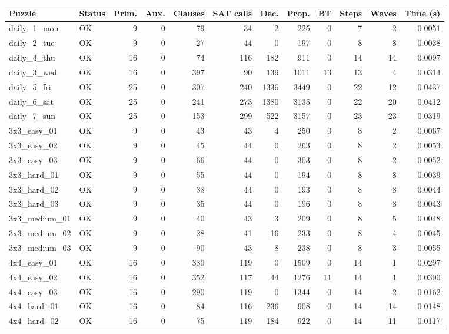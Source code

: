 \begin{tabular}{l l r r r r r r r r r r }
\hline
Puzzle & Status & Prim. & Aux. & Clauses & SAT calls & Dec. & Prop. & BT & Steps & Waves & Time (s) \\
\hline
daily\_1\_mon & OK & 9 & 0 & 79 & 34 & 2 & 225 & 0 & 7 & 2 & 0.0051 \\
daily\_2\_tue & OK & 9 & 0 & 27 & 44 & 0 & 197 & 0 & 8 & 8 & 0.0038 \\
daily\_4\_thu & OK & 16 & 0 & 74 & 116 & 182 & 911 & 0 & 14 & 14 & 0.0097 \\
daily\_3\_wed & OK & 16 & 0 & 397 & 90 & 139 & 1011 & 13 & 13 & 4 & 0.0314 \\
daily\_5\_fri & OK & 25 & 0 & 307 & 240 & 1336 & 3449 & 0 & 22 & 12 & 0.0437 \\
daily\_6\_sat & OK & 25 & 0 & 241 & 273 & 1380 & 3135 & 0 & 22 & 20 & 0.0412 \\
daily\_7\_sun & OK & 25 & 0 & 153 & 299 & 522 & 3157 & 0 & 23 & 23 & 0.0319 \\
3x3\_easy\_01 & OK & 9 & 0 & 43 & 43 & 4 & 250 & 0 & 8 & 2 & 0.0067 \\
3x3\_easy\_02 & OK & 9 & 0 & 45 & 44 & 0 & 263 & 0 & 8 & 2 & 0.0053 \\
3x3\_easy\_03 & OK & 9 & 0 & 66 & 44 & 0 & 303 & 0 & 8 & 2 & 0.0052 \\
3x3\_hard\_01 & OK & 9 & 0 & 55 & 44 & 0 & 194 & 0 & 8 & 8 & 0.0039 \\
3x3\_hard\_02 & OK & 9 & 0 & 38 & 44 & 0 & 193 & 0 & 8 & 8 & 0.0044 \\
3x3\_hard\_03 & OK & 9 & 0 & 35 & 44 & 0 & 196 & 0 & 8 & 8 & 0.0043 \\
3x3\_medium\_01 & OK & 9 & 0 & 40 & 43 & 3 & 209 & 0 & 8 & 5 & 0.0048 \\
3x3\_medium\_02 & OK & 9 & 0 & 28 & 41 & 16 & 233 & 0 & 8 & 4 & 0.0045 \\
3x3\_medium\_03 & OK & 9 & 0 & 90 & 43 & 8 & 238 & 0 & 8 & 3 & 0.0055 \\
4x4\_easy\_01 & OK & 16 & 0 & 380 & 119 & 0 & 1509 & 0 & 14 & 1 & 0.0297 \\
4x4\_easy\_02 & OK & 16 & 0 & 352 & 117 & 44 & 1276 & 11 & 14 & 1 & 0.0300 \\
4x4\_easy\_03 & OK & 16 & 0 & 290 & 119 & 0 & 1344 & 0 & 14 & 2 & 0.0162 \\
4x4\_hard\_01 & OK & 16 & 0 & 84 & 116 & 236 & 908 & 0 & 14 & 14 & 0.0148 \\
4x4\_hard\_02 & OK & 16 & 0 & 75 & 119 & 184 & 922 & 0 & 14 & 11 & 0.0117 \\

\end{tabular}
